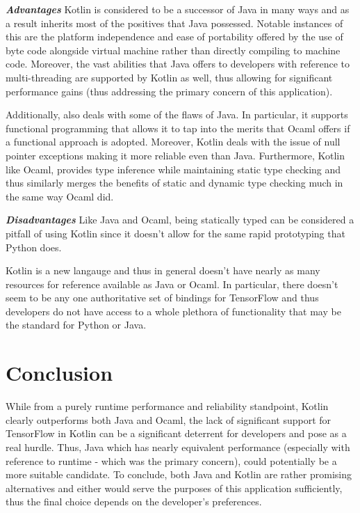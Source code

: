 \textbf{\textit{Advantages}}\newline
Kotlin is considered to be a successor of Java in many ways and as a result inherits most of the positives that Java possessed. Notable instances of this are the platform independence and ease of portability offered by the use of byte code alongside virtual machine rather than directly compiling to machine code. Moreover, the vast abilities that Java offers to developers with reference to multi-threading are supported by Kotlin as well, thus allowing for significant performance gains (thus addressing the primary concern of this application). \newline

\noindent Additionally, also deals with some of the flaws of Java. In particular, it supports functional programming that allows it to tap into the merits that Ocaml offers if a functional approach is adopted. Moreover, Kotlin deals with the issue of null pointer exceptions making it more reliable even than Java. Furthermore, Kotlin like Ocaml, provides type inference while maintaining static type checking and thus similarly merges the benefits of static and dynamic type checking much in the same way Ocaml did. \newline

\noindent \textbf{\textit{Disadvantages}}\newline
\noindent Like Java and Ocaml, being statically typed can be considered a pitfall of using Kotlin since it doesn't allow for the same rapid prototyping that Python does. \newline

\noindent Kotlin is a new langauge and thus in general doesn't have nearly as many resources for reference available as Java or Ocaml. In particular, there doesn't seem to be any one authoritative set of bindings for TensorFlow and thus developers do not have access to a whole plethora of functionality that may be the standard for Python or Java. 

\section{Conclusion}
While from a purely runtime performance and reliability standpoint, Kotlin clearly outperforms both Java and Ocaml, the lack of significant support for TensorFlow in Kotlin can be a significant deterrent for developers and pose as a real hurdle. Thus, Java which has nearly equivalent performance (especially with reference to runtime - which was the primary concern), could potentially be a more suitable candidate. To conclude, both Java and Kotlin are rather promising alternatives and either would serve the purposes of this application sufficiently, thus the final choice depends on the developer's preferences. 

